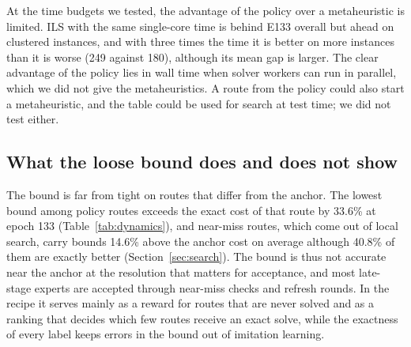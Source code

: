 \documentclass[preprint,12pt,authoryear]{elsarticle}
\begin{document}
\begin{table}[t]
\centering
\caption{Computing cost and plan quality on Real529. Single-core time per instance for the metaheuristics is the stated multiple of the mean single-core time of E133. Gap is the mean per-instance percentage relative to E133, as in Table~\ref{tab:meta}. Training times are summed solver/search worker times, not measured process CPU time.}
\label{tab:breakeven}
\small
{}
\end{table}

At the time budgets we tested, the advantage of the policy over a metaheuristic is limited. ILS with the same single-core time is behind E133 overall but ahead on clustered instances, and with three times the time it is better on more instances than it is worse (249 against 180), although its mean gap is larger. The clear advantage of the policy lies in wall time when solver workers can run in parallel, which we did not give the metaheuristics. A route from the policy could also start a metaheuristic, and the table could be used for search at test time; we did not test either.

\subsection{What the loose bound does and does not show}
\label{sec:loose}

The bound is far from tight on routes that differ from the anchor. The lowest bound among policy routes exceeds the exact cost of that route by 33.6\% at epoch 133 (Table~\ref{tab:dynamics}), and near-miss routes, which come out of local search, carry bounds 14.6\% above the anchor cost on average although 40.8\% of them are exactly better (Section~\ref{sec:search}). The bound is thus not accurate near the anchor at the resolution that matters for acceptance, and most late-stage experts are accepted through near-miss checks and refresh rounds. In the recipe it serves mainly as a reward for routes that are never solved and as a ranking that decides which few routes receive an exact solve, while the exactness of every label keeps errors in the bound out of imitation learning.
\end{document}
